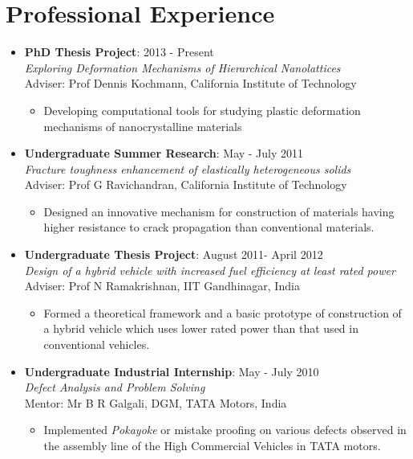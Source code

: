 \documentclass[10pt,fleqn]{article}
\begin{document}
\section*{Professional Experience}
\begin{itemize}

\item[] \textbf{PhD Thesis Project}: \hfill 2013 - Present\\
		\emph{Exploring Deformation Mechanisms of Hierarchical Nanolattices} \\
		 Adviser: Prof Dennis Kochmann, California Institute of Technology
		  \begin{itemize}
		  \item  Developing computational tools for studying plastic deformation mechanisms of nanocrystalline materials
 		  \end{itemize}
 		  
\item[] \textbf{Undergraduate Summer Research}: \hfill May - July 2011\\
		\emph{Fracture toughness enhancement of elastically heterogeneous solids} \\
		  Adviser: Prof G Ravichandran, California Institute of Technology
		   \begin{itemize}
			\item Designed an innovative mechanism for construction of materials having higher resistance to crack propagation than conventional materials.
 			\end{itemize}
 			
\item[] \textbf{Undergraduate Thesis Project}: \hfill August 2011- April 2012\\
		\emph{Design of a hybrid vehicle with increased fuel efficiency at least rated power}\\
		  Adviser: Prof N Ramakrishnan, IIT Gandhinagar, India
		   \begin{itemize}
			\item Formed a theoretical framework and a basic prototype of construction of a hybrid vehicle which uses lower rated power than that used in conventional vehicles.
 			\end{itemize} 
 			
\item[] \textbf{Undergraduate Industrial Internship}: \hfill May - July 2010\\
		\emph{Defect Analysis and Problem Solving}\\
		 Mentor: Mr B R Galgali, DGM, TATA Motors, India
		    \begin{itemize}
			\item Implemented \emph{Pokayoke} or mistake proofing on various defects observed in the assembly line of the High Commercial Vehicles in TATA motors.
 			\end{itemize} 			
\end{itemize}
\end{document}
